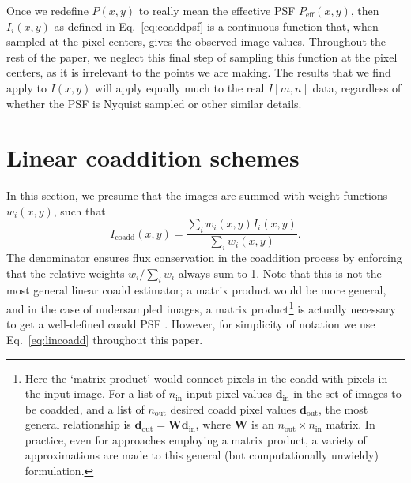 \documentclass{aastex63}
\newcommand{\mike}[1]{{\color{cyan}MJ: #1}}
\begin{document}


Once we redefine $P(x,y)$ to really mean the effective PSF $P_\text{eff}(x,y)$, then $I_i(x,y)$ as defined in Eq.~\eqref{eq:coaddpsf} is a continuous function that, when sampled at the pixel centers, gives the observed image values.
Throughout the rest of the paper, we neglect this final step of sampling this function at the pixel centers, as it is irrelevant to the points we are making.  The results that we find apply to $I(x,y)$ will apply equally much to the real $I[m,n]$ data, regardless of whether the PSF is Nyquist sampled or other similar details.

\section{Linear coaddition schemes}\label{sec:lin}

In this section, we presume that the images are summed with weight functions $w_i(x,y)$, such that
\begin{equation}\label{eq:lincoadd}
    I_\text{coadd}(x,y) = \frac{\sum_i w_i(x,y) I_i(x,y)}{\sum_i w_i(x,y)}.
\end{equation}
The denominator ensures flux conservation in the coaddition process by enforcing that the relative weights $w_i/\sum_i w_i$ always sum to 1. Note that this is not the most general linear coadd estimator; a matrix product would be more general, and in the case of undersampled images, a matrix product\footnote{Here the `matrix product' would connect pixels in the coadd with pixels in the input image.  For a list of $n_\text{in}$ input pixel values $\mathbf{d}_\text{in}$ in the set of images to be coadded, and a list of $n_\text{out}$ desired coadd pixel values $\mathbf{d}_\text{out}$, the most general relationship is $\mathbf{d}_\text{out} = \mathbf{W} \mathbf{d}_\text{in}$, where $\mathbf{W}$ is an $n_\text{out}\times n_\text{in}$ matrix.  In practice, even for approaches employing a matrix product, a variety of approximations are made to this general (but computationally unwieldy) formulation.} is actually necessary to get a well-defined coadd PSF \citep{2011ApJ...741...46R}.  However, for simplicity of notation we use Eq.~\eqref{eq:lincoadd} throughout this paper.
\end{document}
